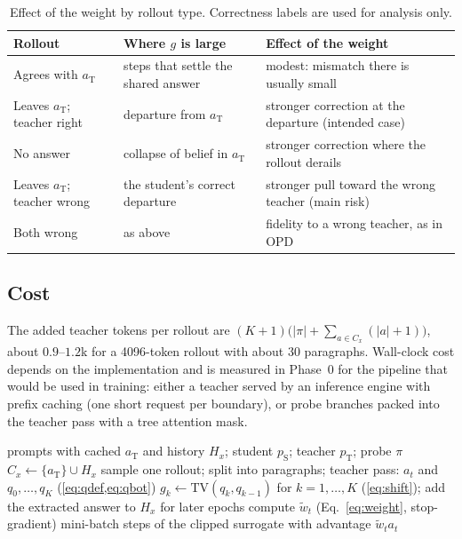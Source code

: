 \documentclass[11pt]{article}
\theoremstyle{definition}
\theoremstyle{remark}
\newcommand{\pT}{p_{\mathrm{T}}}
\newcommand{\pS}{p_{\mathrm{S}}}
\newcommand{\aT}{a_{\mathrm{T}}}
\newcommand{\TV}{\mathrm{TV}}
\begin{document}
\begin{table}[h]
\centering
\small
\begin{tabular}{@{}>{\raggedright\arraybackslash}p{3.8cm}>{\raggedright\arraybackslash}p{4.4cm}>{\raggedright\arraybackslash}p{5.6cm}@{}}
\toprule
Rollout & Where $g$ is large & Effect of the weight \\
\midrule
Agrees with $\aT$ & steps that settle the shared answer & modest: mismatch there is usually small \\
Leaves $\aT$; teacher right & departure from $\aT$ & stronger correction at the departure (intended case) \\
No answer & collapse of belief in $\aT$ & stronger correction where the rollout derails \\
Leaves $\aT$; teacher wrong & the student's correct departure & stronger pull toward the wrong teacher (main risk) \\
Both wrong & as above & fidelity to a wrong teacher, as in OPD \\
\bottomrule
\end{tabular}
\caption{Effect of the weight by rollout type. Correctness labels are used for analysis only.}
\label{tab:cases}
\end{table}

\subsection{Cost}
\label{sec:cost}
The added teacher tokens per rollout are $(K{+}1)\big(|\pi|+\sum_{a\in C_x}(|a|+1)\big)$, about $0.9$--$1.2$k for a 4096-token rollout with about 30 paragraphs. Wall-clock cost depends on the implementation and is measured in Phase~0 for the pipeline that would be used in training: either a teacher served by an inference engine with prefix caching (one short request per boundary), or probe branches packed into the teacher pass with a tree attention mask.

\begin{algorithm}[t]
\caption{Answer-shift-weighted OPD (one rollout batch)}
\label{alg:cw}
\begin{algorithmic}[1]
\Require prompts with cached $\aT$ and history $H_x$; student $\pS$; teacher $\pT$; probe $\pi$
  \State $C_x\gets\{\aT\}\cup H_x$ 
  \State sample one rollout; split into paragraphs; teacher pass: $a_t$ and $q_0,\dots,q_K$ (\cref{eq:qdef,eq:qbot})
  \State $g_k\gets\TV(q_k,q_{k-1})$ for $k=1,\dots,K$ (\cref{eq:shift}); add the extracted answer to $H_x$ for later epochs
\EndFor
\State compute $\tilde w_t$ (Eq.~\eqref{eq:weight}, stop-gradient)
 mini-batch steps of the clipped surrogate with advantage $\tilde w_t a_t$
\end{algorithmic}
\end{algorithm}
\end{document}

